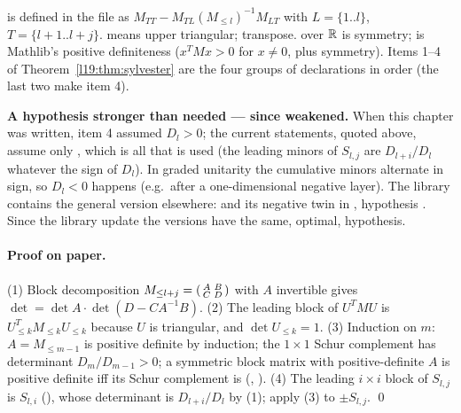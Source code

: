 \begin{dictionary}
 is defined in the file as
$M_{TT} - M_{TL}(M_{\le l})^{-1}M_{LT}$ with $L = \{1..l\}$, $T = \{l+1..l+j\}$.
 means upper triangular;  transpose.  over
$\mathbb{R}$ is symmetry;  is Mathlib's positive definiteness ($x^TMx>0$ for $x\ne0$, plus
symmetry). Items 1--4 of Theorem~\ref{l19:thm:sylvester} are the four groups of declarations in
order (the last two make item 4).

\textbf{A hypothesis stronger than needed --- since weakened.} When this chapter was written, item 4 assumed $D_l>0$;
the current statements, quoted above, assume only , which is all that is used (the
leading minors of $S_{l,j}$ are $D_{l+i}/D_l$ whatever the sign of $D_l$). In graded unitarity
the cumulative minors alternate in sign, so $D_l<0$ happens (e.g.\ after a one-dimensional negative
layer). The library contains the general version elsewhere:
\allowbreak{}\allowbreak{}\allowbreak{}\allowbreak{}\allowbreak{}\allowbreak{}\allowbreak{}\allowbreak{} and its negative twin in
, hypothesis . Since the
library update the  versions have the same, optimal, hypothesis.
\end{dictionary}

\paragraph{Proof on paper.} (1) Block decomposition
$M_{\le l+j} = \begin{psmallmatrix}A&B\\C&D\end{psmallmatrix}$ with $A$ invertible gives
$\det = \det A\cdot\det(D-CA^{-1}B)$. (2) The leading block of $U^TMU$ is
$U_{\le k}^TM_{\le k}U_{\le k}$ because $U$ is triangular, and $\det U_{\le k} = 1$. (3) Induction on
$m$: $A = M_{\le m-1}$ is positive definite by induction; the $1\times1$ Schur complement has determinant
$D_m/D_{m-1}>0$; a symmetric block matrix with positive-definite $A$ is positive definite iff its Schur
complement is (\allowbreak{}\allowbreak{}\allowbreak{}, ).
(4) The leading $i\times i$ block of $S_{l,j}$ is $S_{l,i}$ (\allowbreak{}),
whose determinant is $D_{l+i}/D_l$ by (1); apply (3) to $\pm S_{l,j}$. \qed


